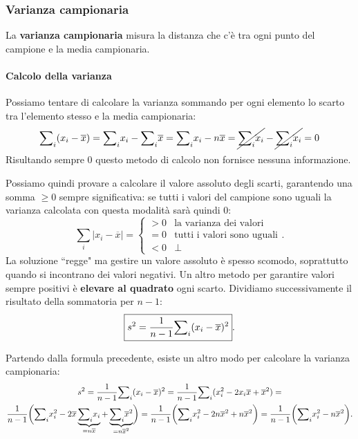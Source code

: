 \subsubsection{Varianza campionaria}
La \textbf{varianza campionaria} misura la distanza che c'è tra ogni punto del campione e la media campionaria.

\paragraph{Calcolo della varianza}
Possiamo tentare di calcolare la varianza sommando per ogni elemento lo scarto tra l'elemento stesso e la media campionaria:
$$
{\sum}_i (x_i - \overline{x}) = 
{\sum}_i x_i - {\sum}_i \overline{x} = 
{\sum}_i x_i - n\overline{x} = 
\cancel{{\sum}_i x_i} - \cancel{{\sum}_i x_i} = 0
$$
\noindent Risultando sempre $0$ questo metodo di calcolo non fornisce nessuna informazione.

\noindent Possiamo quindi provare a calcolare il \textrm{valore assoluto} degli scarti, garantendo una somma $\geq 0$ sempre significativa: se tutti i valori del campione sono uguali la varianza calcolata con questa modalità sarà quindi 0:
\[
{\sum}_i{| x_i - \overline{x} |} = \begin{cases}
> 0 & \text{la varianza dei valori} \\
= 0 & \text{tutti i valori sono uguali} \\
< 0 & \perp
\end{cases}.
\]
\newline
La soluzione ``regge" ma gestire un valore assoluto è spesso scomodo, soprattutto quando si incontrano dei valori negativi. Un altro metodo per garantire valori sempre positivi è \textbf{elevare al quadrato} ogni scarto. Dividiamo successivamente il risultato della sommatoria per $n-1$:
\[
\boxed{
\mathnormal{s}^2 = \frac{1}{n-1} {\sum}_i{(x_i - \overline{x})^2}
}.
\]

\noindent Partendo dalla formula precedente, esiste un altro modo per calcolare la varianza campionaria:
\begin{gather*}
\mathnormal{s}^2 = \frac{1}{n-1}
{\sum}_i{(x_i - \overline{x})^2} = \frac{1}{n-1}{\sum}_i{(x_i^2 - 2x_i\overline{x} + \overline{x}^2)} = \\
\frac{1}{n-1} \biggl ({\sum}_i{x_i^2} -
2\overline{x} \underbrace{{\sum}_i x_i}_{=n\overline x} +
\underbrace{{\sum}_i{\overline{x}^2}} _{=n\overline x^2} \biggr) =
\frac{1}{n-1} \biggl ({\sum}_i{x_i^2} -
2n\overline{x}^2 +
n\overline{x}^2 \biggr ) =
\frac{1}{n-1} \biggl ({\sum}_i{x_i^2} - n\overline{x}^2 \biggr ).
\end{gather*}

